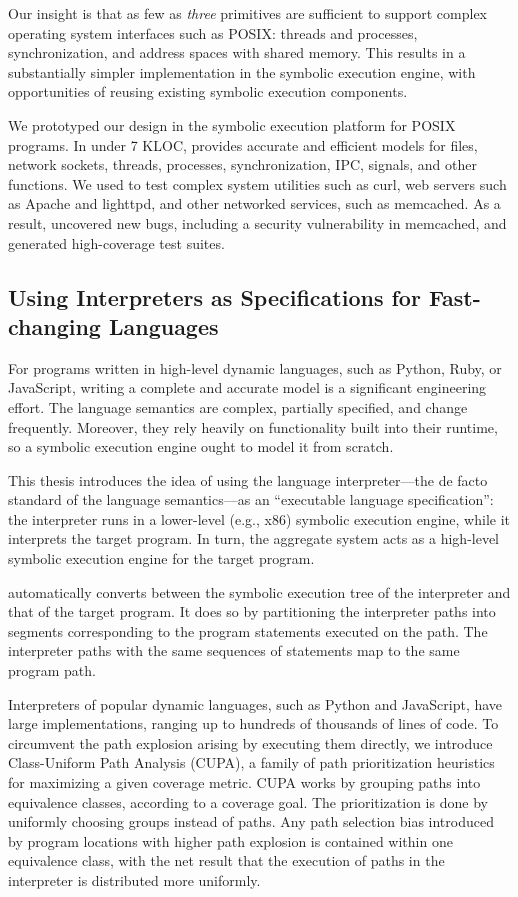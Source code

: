 Our insight is that as few as \emph{three} primitives are sufficient to support complex operating system interfaces such as POSIX: threads and processes, synchronization, and address spaces with shared memory.
%
This results in a substantially simpler implementation in the symbolic execution engine, with opportunities of reusing existing symbolic execution components.

We prototyped our design in the \emph{\cnine} symbolic execution platform for POSIX programs.  In under 7 KLOC, \cnine provides accurate and efficient models for files, network sockets, threads, processes, synchronization, IPC, signals, and other functions.
%
We used \cnine to test complex system utilities such as \textsf{curl}, web servers such as Apache and lighttpd, and other networked services, such as memcached.
%
As a result, \cnine uncovered new bugs, including a security vulnerability in memcached, and generated high-coverage test suites.


\subsection{Using Interpreters as Specifications for Fast-changing Languages}

For programs written in high-level dynamic languages, such as Python, Ruby, or JavaScript, writing a complete and accurate model is a significant engineering effort.
%
The language semantics are complex, partially specified, and change frequently.  Moreover, they rely heavily on functionality built into their runtime, so a symbolic execution engine ought to model it from scratch.

This thesis introduces the idea of using the language interpreter---the de facto standard of the language semantics---as an ``executable language specification'': the interpreter runs in a lower-level (e.g., x86) symbolic execution engine, while it interprets the target program.  In turn, the aggregate system acts as a high-level symbolic execution engine for the target program.

\chef automatically converts between the symbolic execution tree of the interpreter and that of the target program.
%
It does so by partitioning the interpreter paths into segments corresponding to the program statements executed on the path.  The interpreter paths with the same sequences of statements map to the same program path.

Interpreters of popular dynamic languages, such as Python and JavaScript, have large implementations, ranging up to hundreds of thousands of lines of code.
%
To circumvent the path explosion arising by executing them directly, we introduce Class-Uniform Path Analysis (CUPA), a family of path prioritization heuristics for maximizing a given coverage metric.
%
CUPA works by grouping paths into equivalence classes, according to a coverage goal.  The prioritization is done by uniformly choosing groups instead of paths.  Any path selection bias introduced by program locations with higher path explosion is contained within one equivalence class, with the net result that the execution of paths in the interpreter is distributed more uniformly.

